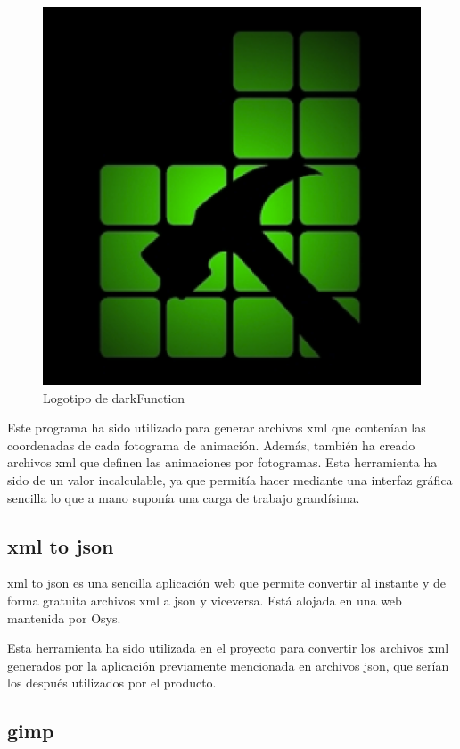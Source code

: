 		\begin{figure}[!htp]
			 \centering
			 \includegraphics{fig/darkF}
			 \caption{Logotipo de darkFunction}
			 \label{fig:darkF}
		\end{figure}

		Este programa ha sido utilizado para generar archivos \acrshort{xml} que contenían las coordenadas de cada fotograma de animación. Además, también ha creado archivos \acrshort{xml} que definen las animaciones por fotogramas. Esta herramienta ha sido de un valor incalculable, ya que permitía hacer mediante una interfaz gráfica sencilla lo que a mano suponía una carga de trabajo grandísima.

	\subsection{\acrshort{xml} to \acrshort{json}}

		\acrshort{xml} to \acrshort{json} es una sencilla aplicación web que permite convertir al instante y de forma gratuita archivos \acrshort{xml} a \acrshort{json} y viceversa. Está alojada en una web mantenida por Osys.

		Esta herramienta ha sido utilizada en el proyecto para convertir los archivos \acrshort{xml} generados por la aplicación previamente mencionada en archivos \acrshort{json}, que serían los después utilizados por el producto.

	\subsection{\acrshort{gimp}}

